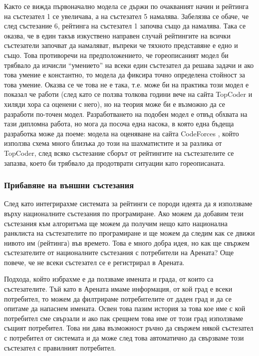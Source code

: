 \documentclass[a4paper,12pt]{article}
\begin{document}
  Както се вижда първоначално модела се държи по очакваният начин и рейтинга на състезател 1 се увеличава, а на състезател 5 намалява. Забелязва се обаче, че след състезание 6, рейтинга на състезател 1 започва също да намалява. Така се оказва, че в един такъв изкуствено направен случай рейтингите на всички състезатели започват да намаляват, въпреки че тяхното представяне е едно и също. Това противоречи на предположението, че гореописаният модел би трябвало да изчисли ``умението'' на всеки един състезател да решава задачи и ако това умение е константно, то модела да фиксира точно определена стойност за това умение. Оказва се че това не е така, т.е. може би на практика този модел е показал че работи (след като се ползва толкова години вече на сайта TopCoder и хиляди хора са оценени с него), но на теория може би е възможно да се разработи по-точен модел. Разработването на подобен модел е отвъд обхвата на тази дипломна работа, но мога да посоча една насока, в която една бъдеща разработка може да поеме: модела на оценяване на сайта CodeForces \cite{code_forces}, който използва схема много близъка до този на шахматистите и за разлика от TopCoder, след всяко състезание сборът от рейтингите на състезателите се запазва, което би трябвало да продотврати ситуации като гореописаната.
  
  \subsubsection{Прибавяне на външни състезания}
    След като интегрирахме системата за рейтинги се породи идеята да я използваме върху националните състезания по програмиране. Ако можем да добавим тези състезания към алгоритъма ще можем да получим нещо като национална ранклиста на състезателите по програмиране и ще можем да следим как се движи нивото им (рейтинга) във времето. Това е много добра идея, но как ще свържем състезателите от националните състезания с потребители на Арената? Още повече, че не всеки състезател се е регистрирал в Арената.
    
    Подхода, който избрахме е да ползваме имената и града, от които са състезателите. Тъй като в Арената имаме информация, от кой град е всеки потребител, то можем да филтрираме потребителите от даден град и да се опитаме да напаснем имената. Освен това пазим история за това кое име с кой потребител сме свързали и ако пак срещнем това име от този град използваме същият потребител. Това ни дава възможност ръчно да свържем някой състезател с потребител от системата и да може след това автоматично да свързваме този състезател с правилният потребител.
    
\end{document}
